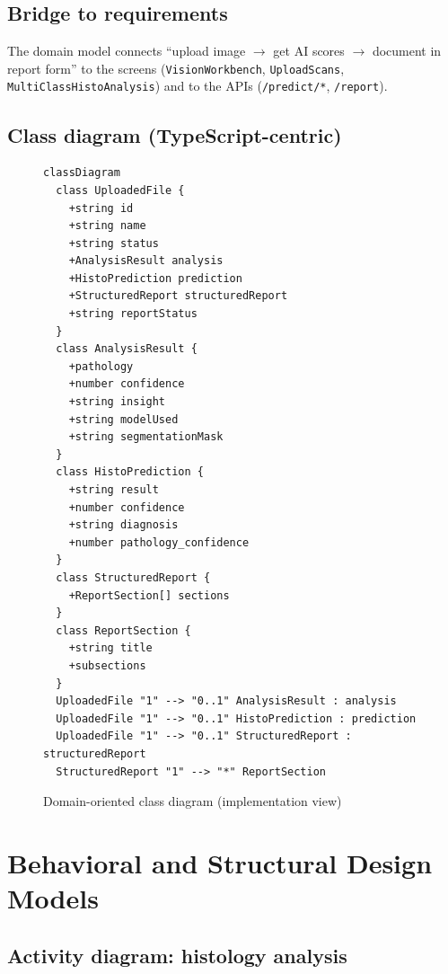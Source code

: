 \subsection{Bridge to requirements}

The domain model connects ``upload image $\rightarrow$ get AI scores $\rightarrow$ document in report form'' to the screens (\texttt{VisionWorkbench}, \texttt{UploadScans}, \texttt{MultiClassHistoAnalysis}) and to the APIs (\texttt{/predict/*}, \texttt{/report}).

\subsection{Class diagram (TypeScript-centric)}
\label{sec:class-domain}

\begin{figure}[htbp]
  \centering
  \begin{minipage}{0.92\textwidth}
  \begin{lstlisting}
classDiagram
  class UploadedFile {
    +string id
    +string name
    +string status
    +AnalysisResult analysis
    +HistoPrediction prediction
    +StructuredReport structuredReport
    +string reportStatus
  }
  class AnalysisResult {
    +pathology
    +number confidence
    +string insight
    +string modelUsed
    +string segmentationMask
  }
  class HistoPrediction {
    +string result
    +number confidence
    +string diagnosis
    +number pathology_confidence
  }
  class StructuredReport {
    +ReportSection[] sections
  }
  class ReportSection {
    +string title
    +subsections
  }
  UploadedFile "1" --> "0..1" AnalysisResult : analysis
  UploadedFile "1" --> "0..1" HistoPrediction : prediction
  UploadedFile "1" --> "0..1" StructuredReport : structuredReport
  StructuredReport "1" --> "*" ReportSection
  \end{lstlisting}
  \end{minipage}
  \caption{Domain-oriented class diagram (implementation view)}
\end{figure}

\section{Behavioral and Structural Design Models}
\label{sec:behavioral}

\subsection{Activity diagram: histology analysis}

